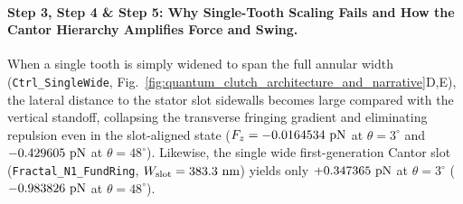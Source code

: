 \documentclass[11pt,letterpaper]{article}
\begin{document}
\paragraph{Step 3, Step 4 \& Step 5: Why Single-Tooth Scaling Fails and How the Cantor Hierarchy Amplifies Force and Swing.}
When a single tooth is simply widened to span the full annular width (\texttt{Ctrl\_SingleWide}, Fig.~\ref{fig:quantum_clutch_architecture_and_narrative}D,E), the lateral distance to the stator slot sidewalls becomes large compared with the vertical standoff, collapsing the transverse fringing gradient and eliminating repulsion even in the slot-aligned state ($F_z = -0.0164534{}\text{ pN}$ at $\theta=3^\circ$ and $-0.429605{}\text{ pN}$ at $\theta=48^\circ$). Likewise, the single wide first-generation Cantor slot (\texttt{Fractal\_N1\_FundRing}, $W_{\rm slot} = 383.3\text{ nm}$) yields only $+0.347365{}\text{ pN}$ at $\theta=3^\circ$ ($-0.983826{}\text{ pN}$ at $\theta=48^\circ$).
\end{document}
